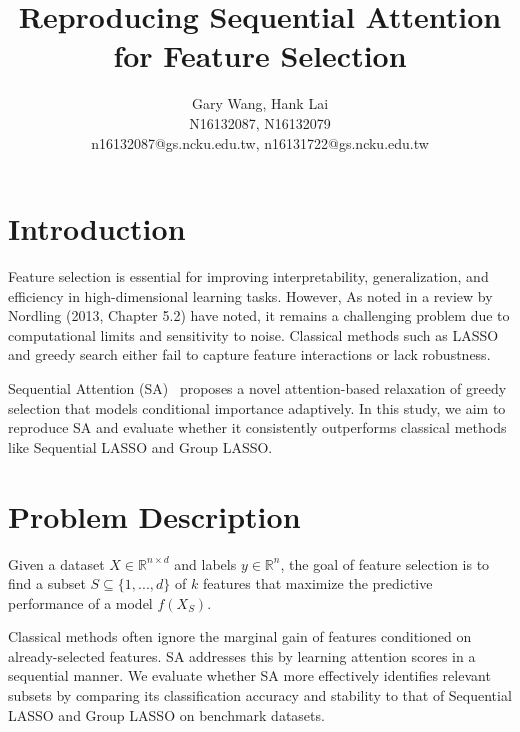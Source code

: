 \documentclass[a4paper,twocolumn]{article} %
\begin{document}

\title{Reproducing Sequential Attention for Feature Selection}
\author{Gary Wang, Hank Lai \\ N16132087, N16132079 \\ n16132087@gs.ncku.edu.tw, n16131722@gs.ncku.edu.tw} 

\maketitle                     %





\section{Introduction}

Feature selection is essential for improving interpretability, generalization, and efficiency in high-dimensional learning tasks.
 However, As noted in a review by Nordling (2013, Chapter 5.2) have noted, it remains a challenging problem due to 
computational limits and sensitivity to noise. Classical methods such as LASSO and greedy search either fail to capture feature interactions or lack robustness.

Sequential Attention (SA)~\cite{yasuda2023} proposes a novel attention-based relaxation of greedy selection that models conditional importance adaptively. 
In this study, we aim to reproduce SA and evaluate whether it consistently outperforms classical methods 
like Sequential LASSO and Group LASSO.


\section{Problem Description}

Given a dataset $X \in \mathbb{R}^{n \times d}$ and labels $y \in \mathbb{R}^n$, the goal of feature selection is to find a subset $S \subseteq \{1, ..., d\}$ of $k$ features that maximize the predictive performance of a model $f(X_S)$.

Classical methods often ignore the marginal gain of features conditioned on already-selected features.
 SA addresses this by learning attention scores in a sequential manner. We evaluate whether SA more effectively 
identifies relevant subsets by comparing its classification accuracy and stability to that of Sequential LASSO and Group LASSO on benchmark datasets.
\end{document}
